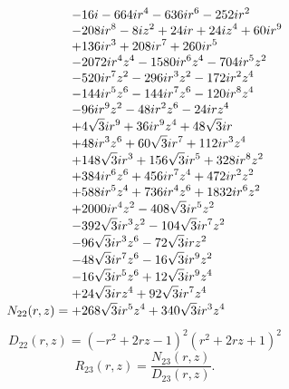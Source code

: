 \documentclass[11pt,a4paper]{article}
\begin{document}
\begin{equation}
N_{22}(r,z)=\shortstack[l]{$\displaystyle  - 16 i - 664 i r^{4} - 636 i r^{6} - 252 i r^{2}$\\
$\displaystyle  - 208 i r^{8} - 8 i z^{2} + 24 i r + 24 i z^{4} + 60 i r^{9}$\\
$\displaystyle  + 136 i r^{3} + 208 i r^{7} + 260 i r^{5}$\\
$\displaystyle  - 2072 i r^{4} z^{4} - 1580 i r^{6} z^{4} - 704 i r^{5} z^{2}$\\
$\displaystyle  - 520 i r^{7} z^{2} - 296 i r^{3} z^{2} - 172 i r^{2} z^{4}$\\
$\displaystyle  - 144 i r^{5} z^{6} - 144 i r^{7} z^{6} - 120 i r^{8} z^{4}$\\
$\displaystyle  - 96 i r^{9} z^{2} - 48 i r^{2} z^{6} - 24 i r z^{4}$\\
$\displaystyle  + 4 \sqrt{3} i r^{9} + 36 i r^{9} z^{4} + 48 \sqrt{3} i r$\\
$\displaystyle  + 48 i r^{3} z^{6} + 60 \sqrt{3} i r^{7} + 112 i r^{3} z^{4}$\\
$\displaystyle  + 148 \sqrt{3} i r^{3} + 156 \sqrt{3} i r^{5} + 328 i r^{8} z^{2}$\\
$\displaystyle  + 384 i r^{6} z^{6} + 456 i r^{7} z^{4} + 472 i r^{2} z^{2}$\\
$\displaystyle  + 588 i r^{5} z^{4} + 736 i r^{4} z^{6} + 1832 i r^{6} z^{2}$\\
$\displaystyle  + 2000 i r^{4} z^{2} - 408 \sqrt{3} i r^{5} z^{2}$\\
$\displaystyle  - 392 \sqrt{3} i r^{3} z^{2} - 104 \sqrt{3} i r^{7} z^{2}$\\
$\displaystyle  - 96 \sqrt{3} i r^{3} z^{6} - 72 \sqrt{3} i r z^{2}$\\
$\displaystyle  - 48 \sqrt{3} i r^{7} z^{6} - 16 \sqrt{3} i r^{9} z^{2}$\\
$\displaystyle  - 16 \sqrt{3} i r^{5} z^{6} + 12 \sqrt{3} i r^{9} z^{4}$\\
$\displaystyle  + 24 \sqrt{3} i r z^{4} + 92 \sqrt{3} i r^{7} z^{4}$\\
$\displaystyle  + 268 \sqrt{3} i r^{5} z^{4} + 340 \sqrt{3} i r^{3} z^{4}$}
\label{eq:cat-numerator-22}
\end{equation}
\begin{equation}
D_{22}(r,z)=\left(- r^{2} + 2 r z - 1\right)^{2} \left(r^{2} + 2 r z + 1\right)^{2}
\label{eq:cat-denominator-22}
\end{equation}
\begin{equation}
R_{23}(r,z)=\frac{N_{23}(r,z)}{D_{23}(r,z)}.
\label{eq:cat-rational-23}
\end{equation}
\end{document}
